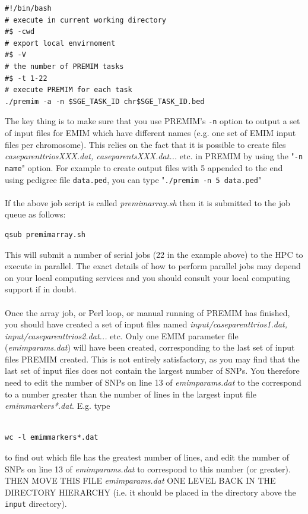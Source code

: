 \documentclass[a4paper,12pt]{article}
\newcommand{\code}[1]{{\footnotesize{{\tt #1}}}}
\begin{document}
\begin{enumerate}
\begin{enumerate}
\begin{lstlisting}
#!/bin/bash
# execute in current working directory
#$ -cwd
# export local envirnoment
#$ -V
# the number of PREMIM tasks 
#$ -t 1-22
# execute PREMIM for each task
./premim -a -n $SGE_TASK_ID chr$SGE_TASK_ID.bed 

\end{lstlisting} \vspace{0.35cm}The key thing is to make sure that you use PREMIM's \code{-n} option to output a set of input files for EMIM which have different names (e.g. one set of EMIM input files per chromosome). This relies on the fact that it is possible to create files {\it caseparenttriosXXX.dat, caseparentsXXX.dat...} etc. in PREMIM by using the "\code{-n name}" option. For example to create output files with 5 appended to the end using pedigree file \code{data.ped}, you can type "\code{./premim -n 5 data.ped}" \\\\If the above job script is called {\it premimarray.sh} then it is submitted to the job queue as follows: \vspace{0.35cm} \begin{lstlisting}
qsub premimarray.sh 
\end{lstlisting} \vspace{0.35cm}This will submit a number of serial jobs (22 in the example above) to the HPC to execute in parallel. The exact details of how to perform parallel jobs may depend on your local computing services and you should consult your local computing support if in doubt. \\\\Once the array job, or Perl loop, or manual running of PREMIM has finished, you should have created a set of input files named {\it input/caseparenttrios1.dat, input/caseparenttrios2.dat...} etc. Only one EMIM parameter file ({\it emimparams.dat}) will have been created, corresponding to the last set of input files PREMIM created. This is not entirely satisfactory, as you may find that the last set of input files does not contain the largest number of SNPs. You therefore need to edit the number of SNPs on line 13 of {\it emimparams.dat} to the correspond to a number greater than the number of lines in the largest input file {\it emimmarkers*.dat}. E.g. type \vspace{0.35cm} \begin{lstlisting}

wc -l emimmarkers*.dat

\end{lstlisting} \vspace{0.35cm}to find out which file has the greatest number of lines, and edit the number of SNPs on line 13 of {\it emimparams.dat} to correspond to this number (or greater). THEN MOVE THIS FILE {\it emimparams.dat} ONE LEVEL BACK IN THE DIRECTORY HIERARCHY (i.e. it should be placed in the directory above the \code{input} directory).\end{enumerate}


\end{enumerate}
\end{document}
